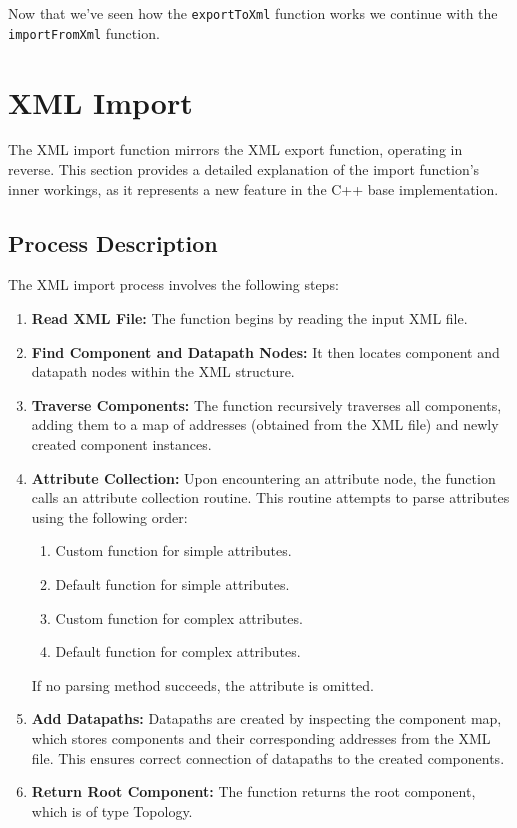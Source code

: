 Now that we've seen how the \verb|exportToXml| function works we continue with the \verb|importFromXml| function.

\section{XML Import}

The XML import function mirrors the XML export function, operating in reverse. This section provides a detailed explanation of the import function's inner workings, as it represents a new feature in the C++ base implementation.

\subsection{Process Description}

The XML import process involves the following steps:

\begin{enumerate}
    \item \textbf{Read XML File:} The function begins by reading the input XML file.
    \item \textbf{Find Component and Datapath Nodes:} It then locates component and datapath nodes within the XML structure.
    \item \textbf{Traverse Components:} The function recursively traverses all components, adding them to a map of addresses (obtained from the XML file) and newly created component instances.
    \item \textbf{Attribute Collection:} Upon encountering an attribute node, the function calls an attribute collection routine. This routine attempts to parse attributes using the following order:
        \begin{enumerate}
            \item Custom function for simple attributes.
            \item Default function for simple attributes.
            \item Custom function for complex attributes.
            \item Default function for complex attributes.
        \end{enumerate}
        If no parsing method succeeds, the attribute is omitted.
    \item \textbf{Add Datapaths:} Datapaths are created by inspecting the component map, which stores components and their corresponding addresses from the XML file. This ensures correct connection of datapaths to the created components.
    \item \textbf{Return Root Component:} The function returns the root component, which is of type Topology.
\end{enumerate}

